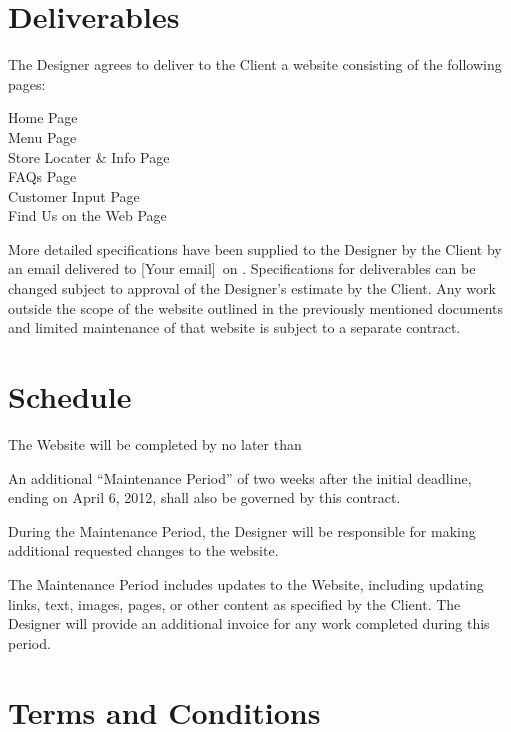 \documentclass[a4paper,12pt]{article} %
\newcommand{\EmployeeEmail}{[Your email]}
\begin{document}
\section{Deliverables}

The Designer agrees to deliver to the Client a website consisting of the following pages:

Home Page\\
Menu Page\\
Store Locater \& Info Page\\
FAQs Page\\
Customer Input Page\\
Find Us on the Web Page

More detailed specifications have been supplied to the Designer by the Client by an email delivered to \EmployeeEmail~on . Specifications for deliverables can be changed subject to approval of the Designer's estimate by the Client. Any work outside the scope of the website outlined in the previously mentioned documents and limited maintenance of that website is subject to a separate contract.


\section{Schedule}

The Website will be completed by no later than

An additional ``Maintenance Period'' of two weeks after the initial deadline, ending on April 6, 2012, shall also be governed by this contract.

During the Maintenance Period, the Designer will be responsible for making additional requested changes to the website.

The Maintenance Period includes updates to the Website, including updating links, text, images, pages, or other content as specified by the Client. The Designer will provide an additional invoice for any work completed during this period.


\section{Terms and Conditions}
\end{document}
